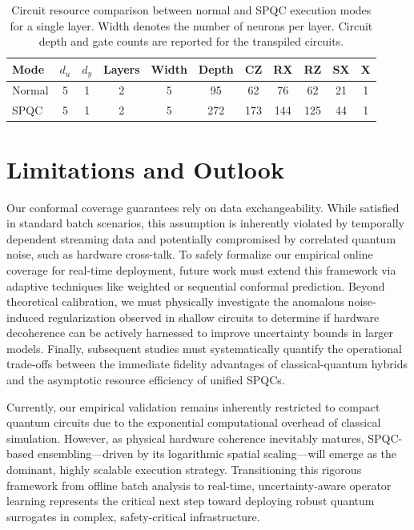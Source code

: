 \documentclass{iopjournal}
\begin{document}
\begin{table}[t]

\caption{Circuit resource comparison between normal and SPQC execution modes for a single layer. Width denotes the number of neurons per layer. Circuit depth and gate counts are reported for the transpiled circuits.}
\label{tab:spqc_vs_normal_gates}

\begin{center}
\begin{tabular}{lcccccccccc}
\hline
\textbf{Mode} & $d_u$ & $d_y$ & \textbf{Layers} & \textbf{Width} & \textbf{Depth} & \textbf{CZ} & \textbf{RX} & \textbf{RZ} & \textbf{SX} & \textbf{X} \\
\hline

Normal & 5 & 1 & 2 & 5 & 95  & 62  & 76  & 62  & 21 & 1 \\
SPQC   & 5 & 1 & 2 & 5 & 272 & 173 & 144 & 125 & 44 & 1 \\

\hline
\end{tabular}
\end{center}

\end{table}

\section{Limitations and Outlook}
\label{sec:limitations}

Our conformal coverage guarantees rely on data exchangeability. While satisfied in standard batch scenarios, this assumption is inherently violated by temporally dependent streaming data and potentially compromised by correlated quantum noise, such as hardware cross-talk. To safely formalize our empirical online coverage for real-time deployment, future work must extend this framework via adaptive techniques like weighted or sequential conformal prediction. Beyond theoretical calibration, we must physically investigate the anomalous noise-induced regularization observed in shallow circuits to determine if hardware decoherence can be actively harnessed to improve uncertainty bounds in larger models. Finally, subsequent studies must systematically quantify the operational trade-offs between the immediate fidelity advantages of classical-quantum hybrids and the asymptotic resource efficiency of unified SPQCs.

Currently, our empirical validation remains inherently restricted to compact quantum circuits due to the exponential computational overhead of classical simulation. However, as physical hardware coherence inevitably matures, SPQC-based ensembling—driven by its logarithmic spatial scaling—will emerge as the dominant, highly scalable execution strategy. Transitioning this rigorous framework from offline batch analysis to real-time, uncertainty-aware operator learning represents the critical next step toward deploying robust quantum surrogates in complex, safety-critical infrastructure.
\end{document}
